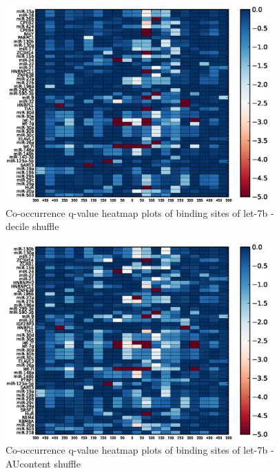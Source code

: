\begin{figure}
   	\includegraphics[width=0.9\textwidth,clip]{appendix1/figures/let-7b_decile_expressed_heatmap_qvalues0.eps}
   	\caption{Co-occurrence q-value heatmap plots of binding sites of let-7b - decile shuffle}
\end{figure}
\clearpage
\begin{figure}
   	\includegraphics[width=0.9\textwidth,clip]{appendix1/figures/let-7b_AUcontent_expressed_heatmap_qvalues0.eps}
   	\caption{Co-occurrence q-value heatmap plots of binding sites of let-7b - AUcontent shuffle}
\end{figure}

